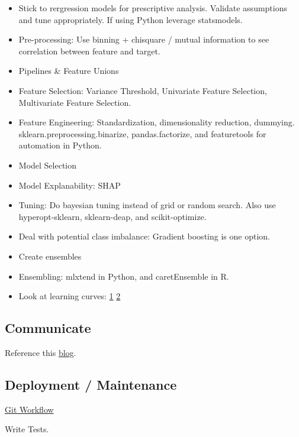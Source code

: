 \documentclass[]{book}
\begin{document}
\begin{itemize}
\item
  Stick to rergression models for prescriptive analysis. Validate
  assumptions and tune appropriately. If using Python leverage
  statsmodels.
\item
  Pre-processing: Use binning + chisquare / mutual information to see
  correlation between feature and target.
\item
  Pipelines \& Feature Unions
\item
  Feature Selection: Variance Threshold, Univariate Feature Selection,
  Multivariate Feature Selection.
\item
  Feature Engineering: Standardization, dimensionality reduction,
  dummying. sklearn.preprocessing.binarize, pandas.factorize, and
  featuretools for automation in Python.
\item
  Model Selection
\item
  Model Explanability: SHAP
\item
  Tuning: Do bayesian tuning instead of grid or random search. Also use
  hyperopt-sklearn, sklearn-deap, and scikit-optimize.
\item
  Deal with potential class imbalance: Gradient boosting is one option.
\item
  Create ensembles
\item
  Ensembling: mlxtend in Python, and caretEnsemble in R.
\item
  Look at learning curves:
  \href{https://www.dataquest.io/blog/learning-curves-machine-learning/}{1}
  \textbar{}
  \href{http://www.scikit-yb.org/en/latest/api/model_selection/learning_curve.html}{2}
\end{itemize}

\subsection{Communicate}\label{communicate}

Reference this
\href{https://www.dataquest.io/blog/data-science-project-style-guide/}{blog}.

\subsection{Deployment / Maintenance}\label{deployment-maintenance}

\href{https://blog.osteele.com/2008/05/my-git-workflow/}{Git Workflow}

Write Tests.
\end{document}
